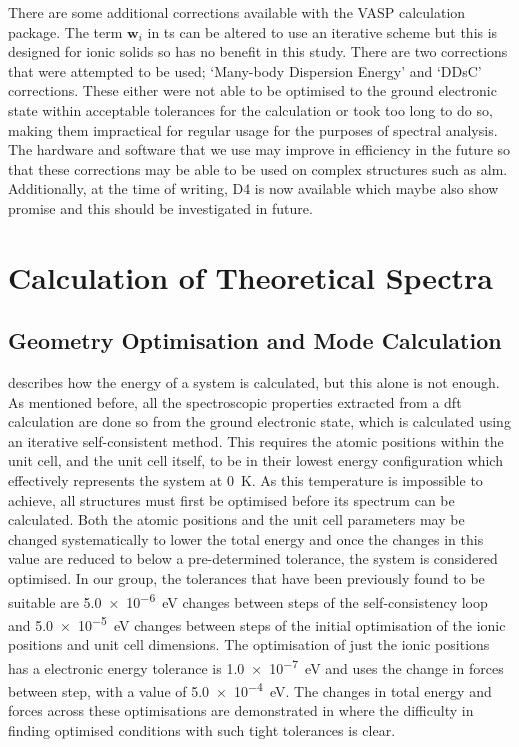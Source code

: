 There are some additional corrections available with the VASP calculation package. The term \(\boldsymbol{w}_i\) in \acrshort{ts} can be altered to use an iterative scheme but this is designed for ionic solids so has no benefit in this study. There are two corrections that were attempted to be used; `Many-body Dispersion Energy' \DIFdelbegin \DIFdel{~}\DIFdelend \cite{PhysRevLett.108.236402} and `DDsC' \DIFdelbegin \DIFdel{~}\DIFdelend \cite{Steinmann2011} corrections. These either were not able to be optimised to the ground electronic state within acceptable tolerances for the calculation or took too long to do so, making them impractical for regular usage for the purposes of spectral analysis. The hardware and software that we use may improve in efficiency in the future so that these corrections may be able to be used on complex structures such as \acrshort{alm}. Additionally, at the time of writing, D4 \DIFdelbegin \DIFdel{~}\DIFdelend \cite{Caldeweyher2017} is now available which maybe also show promise and this should be investigated in future. 

\section{Calculation of Theoretical Spectra}
\subsection{Geometry Optimisation and Mode Calculation}
\label{subsec:GODMCalc}
 describes how the energy of a system is calculated, but this alone is not enough. As mentioned before, all the spectroscopic properties extracted from a \acrshort{dft} calculation are done so from the ground electronic state, which is calculated using an iterative self\nobreakdash-consistent method. This requires the atomic positions within the unit cell, and the unit cell itself, to be in their lowest energy configuration which effectively represents the system at \SI{0}{K}. As this temperature is impossible to achieve, all structures must first be optimised before its spectrum can be calculated. Both the atomic positions and the unit cell parameters may be changed systematically to lower the \DIFdelbegin {}\DIFdelend \DIFaddbegin {}\DIFaddend total energy and once the changes in this value are reduced to below a pre-determined tolerance, the system is considered optimised. In our group, the tolerances that have been previously found to be suitable \DIFdelbegin \DIFdel{~}\DIFdelend \cite{Kendrick2020} are \SI{5.0e-6}{eV} changes between steps of the self\nobreakdash-consistency loop and \SI{5.0e-5}{eV} changes between steps of the initial optimisation of the ionic positions and unit cell dimensions. The optimisation of just the ionic positions has a electronic energy tolerance is \SI{1.0e-7}{eV} and uses the change in forces between step, with a value of \SI{5.0e-4}{eV}. The changes in total energy and forces across these optimisations are demonstrated in  where the difficulty in finding optimised conditions with such tight tolerances is clear.

